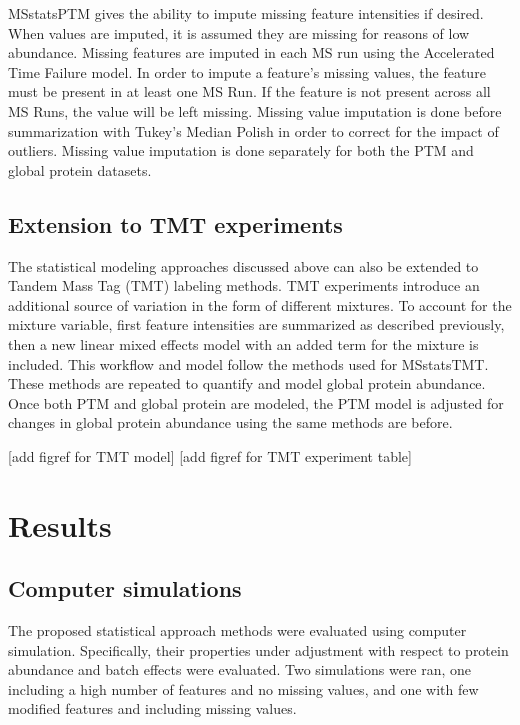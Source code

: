 \documentclass[mcp]{article}
\numberwithin{figure}{section} %
\numberwithin{table}{section}
\def\todo#1{{\color{red}[#1]}}
\begin{document}
MSstatsPTM gives the ability to impute missing feature intensities if desired. When values are imputed, it is assumed they are missing for reasons of low abundance. Missing features are imputed in each MS run using the Accelerated Time Failure model.\cite{Tukey:1977} In order to impute a feature's missing values, the feature must be present in at least one MS Run. If the feature is not present across all MS Runs, the value will be left missing. Missing value imputation is done before summarization with Tukey's Median Polish in order to correct for the impact of outliers. Missing value imputation is done separately for both the PTM and global protein datasets.

\subsection*{Extension to TMT experiments}

The statistical modeling approaches discussed above can also be extended to Tandem Mass Tag (TMT) labeling methods. TMT experiments introduce an additional source of variation in the form of different mixtures. To account for the mixture variable, first feature intensities are summarized as described previously, then a new linear mixed effects model with an added term for the mixture is included. This workflow and model follow the methods used for MSstatsTMT. \cite{Huang:2020} These methods are repeated to quantify and model global protein abundance. Once both PTM and global protein are modeled, the PTM model is adjusted for changes in global protein abundance using the same methods are before.

\todo{add figref for TMT model}
\todo{add figref for TMT experiment table}

\section{Results}

\subsection*{Computer simulations}

The proposed statistical approach methods were evaluated using computer simulation. Specifically, their properties under adjustment with respect to protein abundance and batch effects were evaluated. Two simulations were ran, one including a high number of features and no missing values, and one with few modified features and including missing values.
\end{document}
